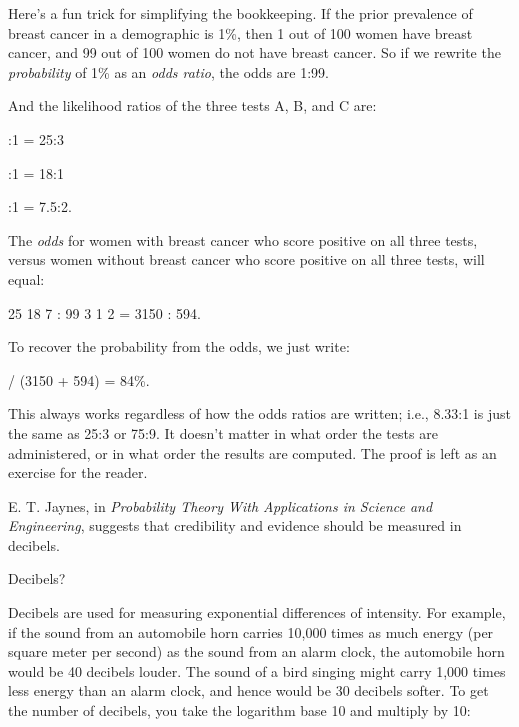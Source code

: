 {
 Here's a fun trick for simplifying the
bookkeeping. If the prior prevalence of breast cancer in a demographic
is 1\%, then 1 out of 100 women have breast cancer, and 99 out of 100
women do not have breast cancer. So if we rewrite the
\textit{probability} of 1\% as an \textit{odds ratio}, the odds are
1:99.}

{
 And the likelihood ratios of the three tests A, B, and C are:}

{:1 = 25:3
\par}


\bigskip

{:1 = 18:1
\par}


\bigskip

{:1 = 7.5:2.
\par}


\bigskip

{
 The \textit{odds} for women with breast cancer who score positive
on all three tests, versus women without breast cancer who score
positive on all three tests, will equal:}

{ {\texttimes} 25 {\texttimes} 18 {\texttimes} 7 : 99 {\texttimes}
3 {\texttimes} 1 {\texttimes} 2 = 3150 : 594.
\par}


\bigskip

{
 To recover the probability from the odds, we just write:}

{ / (3150 + 594) = 84\%.
\par}


\bigskip

{
 This always works regardless of how the odds ratios are written;
i.e., 8.33:1 is just the same as 25:3 or 75:9. It
doesn't matter in what order the tests are
administered, or in what order the results are computed. The proof is
left as an exercise for the reader.}

{
 E. T. Jaynes, in \textit{Probability Theory With Applications in
Science and Engineering}, suggests that credibility and evidence should
be measured in decibels.}

{
 Decibels?}

{
 Decibels are used for measuring exponential differences of
intensity. For example, if the sound from an automobile horn carries
10,000 times as much energy (per square meter per second) as the sound
from an alarm clock, the automobile horn would be 40 decibels louder.
The sound of a bird singing might carry 1,000 times less energy than an
alarm clock, and hence would be 30 decibels softer. To get the number
of decibels, you take the logarithm base 10 and multiply by 10:}

